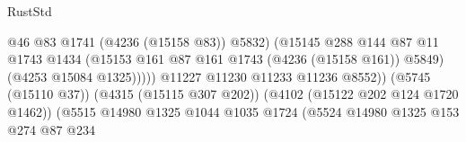 \begin{lexlean}{RustStd}
\begin{coremodule}
                                                            @46
                                                            @83
                                                            @1741
                                                            (@4236 (@15158 @83))
                                                            @5832)
                                                          (@15145
                                                            @288
                                                            @144
                                                            @87
                                                            @11
                                                            @1743
                                                            @1434
                                                            (@15153
                                                              @161
                                                              @87
                                                              @161
                                                              @1743
                                                              (@4236 (@15158 @161))
                                                              @5849)
                                                            (@4253 @15084 @1325)))))
                                                    @11227
                                                    @11230
                                                    @11233
                                                    @11236
                                                    @8552))
                                                (@5745 (@15110 @37))
                                                (@4315 (@15115 @307 @202))
                                                (@4102 (@15122 @202 @124 @1720 @1462))
                                                (@5515
                                                  @14980
                                                  @1325
                                                  @1044
                                                  @1035
                                                  @1724
                                                  (@5524
                                                    @14980
                                                    @1325
                                                    @153
                                                    @274
                                                    @87
                                                    @234

\end{coremodule}
\end{lexlean}
